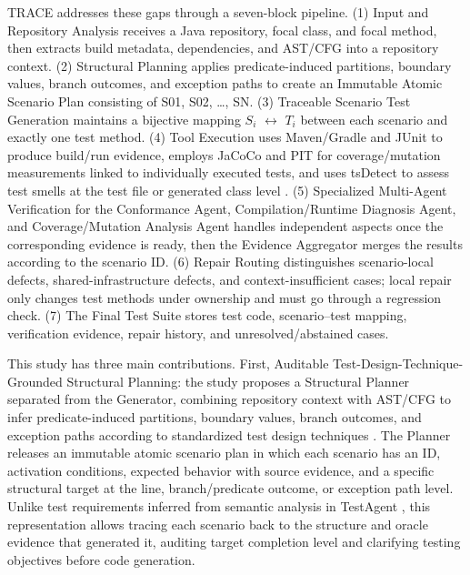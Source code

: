 \documentclass[pdflatex,sn-basic,Numbered,iicol]{sn-jnl}
\begin{document}
TRACE addresses these gaps through a seven-block pipeline. (1) Input and Repository Analysis receives a Java repository, focal class, and focal method, then extracts build metadata, dependencies, and AST/CFG into a repository context. (2) Structural Planning applies predicate-induced partitions, boundary values, branch outcomes, and exception paths to create an Immutable Atomic Scenario Plan consisting of S01, S02, \ldots{}, SN. (3) Traceable Scenario Test Generation maintains a bijective mapping $S_i$ \ensuremath{\leftrightarrow} $T_i$ between each scenario and exactly one test method. (4) Tool Execution uses Maven/Gradle and JUnit to produce build/run evidence, employs JaCoCo and PIT for coverage/mutation measurements linked to individually executed tests, and uses tsDetect to assess test smells at the test file or generated class level \cite{bib35,bib33,bib34,bib25}. (5) Specialized Multi-Agent Verification for the Conformance Agent, Compilation/Runtime Diagnosis Agent, and Coverage/Mutation Analysis Agent handles independent aspects once the corresponding evidence is ready, then the Evidence Aggregator merges the results according to the scenario ID. (6) Repair Routing distinguishes scenario-local defects, shared-infrastructure defects, and context-insufficient cases; local repair only changes test methods under ownership and must go through a regression check. (7) The Final Test Suite stores test code, scenario--test mapping, verification evidence, repair history, and unresolved/abstained cases.

This study has three main contributions. First, Auditable Test-Design-Technique-Grounded Structural Planning: the study proposes a Structural Planner separated from the Generator, combining repository context with AST/CFG to infer predicate-induced partitions, boundary values, branch outcomes, and exception paths according to standardized test design techniques \cite{bib30}. The Planner releases an immutable atomic scenario plan in which each scenario has an ID, activation conditions, expected behavior with source evidence, and a specific structural target at the line, branch/predicate outcome, or exception path level. Unlike test requirements inferred from semantic analysis in TestAgent \cite{bib23}, this representation allows tracing each scenario back to the structure and oracle evidence that generated it, auditing target completion level and clarifying testing objectives before code generation.
\end{document}
